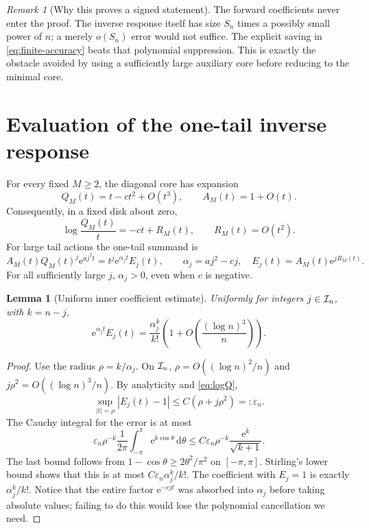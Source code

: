 \documentclass[11pt,a4paper]{article}
\numberwithin{equation}{section}
\newtheorem{lemma}[theorem]{Lemma}
\theoremstyle{definition}
\theoremstyle{remark}\newtheorem{remark}[theorem]{Remark}
\newcommand{\ee}{\mathrm e}\newcommand{\dd}{\mathrm d}
\begin{document}
\begin{remark}[Why this proves a signed statement]
The forward coefficients never enter the proof. The inverse response itself
has size $S_n$ times a possibly small power of $n$; a merely $o(S_n)$ error
would not suffice. The explicit saving in \eqref{eq:finite-accuracy} beats
that polynomial suppression. This is exactly the obstacle avoided by using
a sufficiently large auxiliary core before reducing to the minimal core.
\end{remark}

\section{Evaluation of the one-tail inverse response}
\label{sec:one-tail}

For every fixed $M\ge2$, the diagonal core has expansion
\begin{equation}
 Q_M(t)=t-ct^2+O(t^3),\qquad A_M(t)=1+O(t).
 \label{eq:Qjet}
\end{equation}
Consequently, in a fixed disk about zero,
\begin{equation}
 \log\frac{Q_M(t)}t=-ct+R_M(t),\qquad R_M(t)=O(t^2).
 \label{eq:logQ}
\end{equation}
For large tail actions the one-tail summand is
\begin{equation}
 A_M(t)Q_M(t)^j\ee^{aj^2t}
 =t^j\ee^{\alpha_jt}E_j(t),\qquad
 \alpha_j=aj^2-cj,
 \quad E_j(t)=A_M(t)\ee^{jR_M(t)}.
 \label{eq:factor-one}
\end{equation}
For all sufficiently large $j$, $\alpha_j>0$, even when $c$ is negative.

\begin{lemma}[Uniform inner coefficient estimate]
\label{lem:inner}
Uniformly for integers $j\in\mathcal I_n$, with $k=n-j$,
\begin{equation}
 [t^k]\ee^{\alpha_jt}E_j(t)
 =\frac{\alpha_j^k}{k!}
 \left(1+O\left(\frac{(\log n)^3}{n}\right)\right).
 \label{eq:inner}
\end{equation}
\end{lemma}
\begin{proof}
Use the radius $\rho=k/\alpha_j$. On $\mathcal I_n$,
$\rho=O((\log n)^2/n)$ and $j\rho^2=O((\log n)^3/n)$.
By analyticity and \eqref{eq:logQ},
\[
 \sup_{|t|=\rho}|E_j(t)-1|\le C(\rho+j\rho^2)=:\varepsilon_n.
\]
The Cauchy integral for the error is at most
\[
 \varepsilon_n\rho^{-k}\frac1{2\pi}
 \int_{-\pi}^{\pi}\ee^{k\cos\theta}\,\dd\theta
 \le C\varepsilon_n\rho^{-k}\frac{\ee^k}{\sqrt{k+1}}.
\]
The last bound follows from $1-\cos\theta\ge2\theta^2/\pi^2$ on
$[-\pi,\pi]$. Stirling's lower bound shows that this is at most
$C\varepsilon_n\alpha_j^k/k!$. The coefficient with $E_j=1$ is exactly
$\alpha_j^k/k!$. Notice that the entire factor $\ee^{-cjt}$ was absorbed
into $\alpha_j$ before taking absolute values; failing to do this would
lose the polynomial cancellation we need.
\end{proof}
\end{document}
